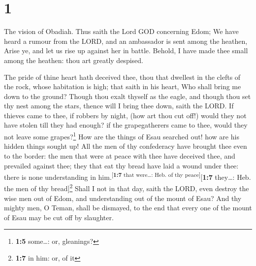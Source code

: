 \hypertarget{section}{%
\section{1}\label{section}}

 The vision of Obadiah. Thus saith the Lord GOD concerning
Edom; We have heard a rumour from the LORD, and an ambassador is sent
among the heathen, Arise ye, and let us rise up against her in battle.
 Behold, I have made thee small among the heathen: thou
art greatly despised.

 The pride of thine heart hath deceived thee, thou that
dwellest in the clefts of the rock, whose habitation is high; that saith
in his heart, Who shall bring me down to the ground? 
Though thou exalt thyself as the eagle, and though thou set thy nest
among the stars, thence will I bring thee down, saith the LORD.
 If thieves came to thee, if robbers by night, (how art
thou cut off!) would they not have stolen till they had enough? if the
grapegatherers came to thee, would they not leave some
grapes?\footnote{\textbf{1:5} some\ldots: or, gleanings?} 
How are the things of Esau searched out! how are his hidden things
sought up!  All the men of thy confederacy have brought
thee even to the border: the men that were at peace with thee have
deceived thee, and prevailed against thee; they that eat thy bread have
laid a wound under thee: there is none understanding in
him.\textsuperscript{{[}\textbf{1:7} that were\ldots: Heb. of thy
peace{]}}{[}\textbf{1:7} they\ldots: Heb. the men of thy
bread{]}\footnote{\textbf{1:7} in him: or, of it}  Shall I
not in that day, saith the LORD, even destroy the wise men out of Edom,
and understanding out of the mount of Esau?  And thy
mighty men, O Teman, shall be dismayed, to the end that every one of the
mount of Esau may be cut off by slaughter.

